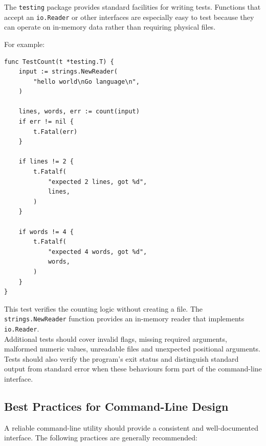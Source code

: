 The \texttt{testing} package provides standard facilities for writing tests. Functions that accept an \texttt{io.Reader} or other interfaces are especially easy to test because they can operate on in-memory data rather than requiring physical files.

For example:

\begin{lstlisting}
func TestCount(t *testing.T) {
    input := strings.NewReader(
        "hello world\nGo language\n",
    )

    lines, words, err := count(input)
    if err != nil {
        t.Fatal(err)
    }

    if lines != 2 {
        t.Fatalf(
            "expected 2 lines, got %d",
            lines,
        )
    }

    if words != 4 {
        t.Fatalf(
            "expected 4 words, got %d",
            words,
        )
    }
}
\end{lstlisting}

This test verifies the counting logic without creating a file. The \texttt{strings.NewReader} function provides an in-memory reader that implements \texttt{io.Reader}.\\

Additional tests should cover invalid flags, missing required arguments, malformed numeric values, unreadable files and unexpected positional arguments. Tests should also verify the program's exit status and distinguish standard output from standard error when these behaviours form part of the command-line interface.\\

\subsection{Best Practices for Command-Line Design}

A reliable command-line utility should provide a consistent and well-documented interface. The following practices are generally recommended:

